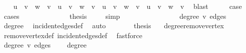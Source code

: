 \begin{isabellebody}
\ \ \isamarkupfalse%
\ {\isachardoublequoteopen}u\ {\isacharequal}{\kern0pt}\ v\ {\isasymand}\ w\ {\isacharequal}{\kern0pt}\ v{\isachardoublequoteclose}\ {\isacharbar}{\kern0pt}\ {\isachardoublequoteopen}u\ {\isasymnoteq}\ v\ {\isasymand}\ w\ {\isacharequal}{\kern0pt}\ v{\isachardoublequoteclose}\ {\isacharbar}{\kern0pt}\ {\isachardoublequoteopen}u\ {\isacharequal}{\kern0pt}\ v\ {\isasymand}\ w\ {\isasymnoteq}\ v{\isachardoublequoteclose}\ {\isacharbar}{\kern0pt}\ {\isachardoublequoteopen}u\ {\isasymnoteq}\ v\ {\isasymand}\ w\ {\isasymnoteq}\ v{\isachardoublequoteclose}\ \isamarkupfalse%
\ blast\isanewline
\ \ \isamarkupfalse%
\ \isamarkupfalse%
\ {\isacharquery}{\kern0pt}case\isanewline
\ \ \isamarkupfalse%
\ cases\isanewline
\ \ \ \ \isamarkupfalse%
\ {}\isanewline
\ \ \ \ \isamarkupfalse%
\ \isamarkupfalse%
\ {\isacharquery}{\kern0pt}thesis\ \isamarkupfalse%
\ {}\ \isamarkupfalse%
\ simp\isanewline
\ \ \isamarkupfalse%
\isanewline
\ \ \ \ \isamarkupfalse%
\ {}\isanewline
\ \ \ \ \isamarkupfalse%
\ \isamarkupfalse%
\ {\isachardoublequoteopen}degree\ v\ edges\ {\isacharequal}{\kern0pt}\ {}{\isachardoublequoteclose}\ \isamarkupfalse%
\ degree{\isacharunderscore}{\kern0pt}{}\ \isamarkupfalse%
\ incident{\isacharunderscore}{\kern0pt}edges{\isacharunderscore}{\kern0pt}def\ \isamarkupfalse%
\ auto\isanewline
\ \ \ \ \isamarkupfalse%
\ \isamarkupfalse%
\ {\isacharquery}{\kern0pt}thesis\ \isamarkupfalse%
\ {}\ degree{\isacharunderscore}{\kern0pt}{}{\isacharunderscore}{\kern0pt}remove{\isacharunderscore}{\kern0pt}vertex\ \isamarkupfalse%
\ remove{\isacharunderscore}{\kern0pt}vertex{\isacharunderscore}{\kern0pt}def\ incident{\isacharunderscore}{\kern0pt}edges{\isacharunderscore}{\kern0pt}def\ \isamarkupfalse%
\ fastforce\isanewline
\ \ \isamarkupfalse%
\isanewline
\ \ \ \ \isamarkupfalse%
\ {}\isanewline
\ \ \ \ \isamarkupfalse%
\ \isamarkupfalse%
\ {\isachardoublequoteopen}degree\ v\ edges\ {\isacharequal}{\kern0pt}\ {}{\isachardoublequoteclose}\ \isamarkupfalse%
\ degree{\isacharunderscore}{\kern0pt}{}\ \isamarkupfalse%

\end{isabellebody}
